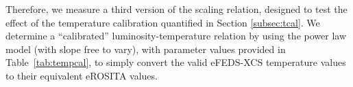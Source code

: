 \documentclass[fleqn,usenatbib]{mnras}
\begin{document}



Therefore, we measure a third version of the scaling relation, designed to test the effect of the temperature calibration quantified in Section \ref{subsec:tcal}.  We determine a ``calibrated'' luminosity-temperature relation by using the power law model (with slope free to vary), with parameter values provided in Table~\ref{tab:tempcal}, to simply convert the valid eFEDS-XCS temperature values to their equivalent eROSITA values.
\end{document}
